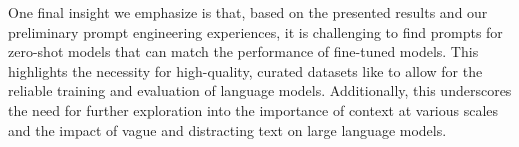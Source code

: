 One final insight we emphasize is that, based on the presented results and our preliminary prompt engineering experiences, it is challenging to find prompts for zero-shot models that can match the performance of fine-tuned models.
This highlights the necessity for high-quality, curated datasets like \dataset{} to allow for the reliable training and evaluation of language models. Additionally, this underscores the need for further exploration into the importance of context at various scales and the impact of vague and distracting text on large language models.
